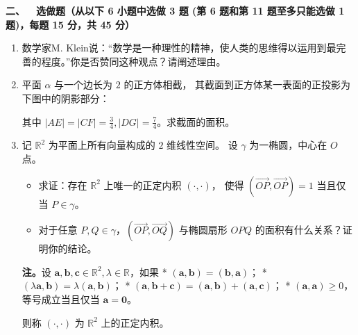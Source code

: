 \textbf{二、\ \ 选做题（从以下 6 小题中选做 3 题
(第 6 题和第 11 题至多只能选做 1 题)，每题 15 分，共 45 分）}
\begin{enumerate}
\item 数学家M. Klein说：``数学是一种理性的精神，使人类的思维得以运用到最完善的程度。''你是否赞同这种观点？请阐述理由。

\item 平面 $\alpha$ 与一个边长为 $2$ 的正方体相截，
其截面到正方体某一表面的正投影为下图中的阴影部分：
其中 $|AE|=|CF|=\frac{3}{4},|DG|=\frac{7}{4}$。求截面的面积。

\item 记 $\mathbb{R}^{2}$ 为平面上所有向量构成的 $2$ 维线性空间。
设 $\gamma$ 为一椭圆，中心在 $O$ 点。
\begin{itemize}
\item[(a)] 求证：存在 $\mathbb{R}^{2}$ 上唯一的正定内积 $(\cdot, \cdot)$，
使得 $(\overrightarrow{OP}, \overrightarrow{OP})=1$ 当且仅当 $P \in \gamma$。
\item[(b)] 对于任意 $P, Q \in \gamma$，$(\overrightarrow{OP}, \overrightarrow{OQ})$ 
与椭圆扇形 $OPQ$ 的面积有什么关系？证明你的结论。
\end{itemize}
\textbf{注。}设 $\mathbf{a}, \mathbf{b}, \mathbf{c} \in \mathbb{R}^{2}, \lambda \in \mathbb{R}$，如果
* $(\mathbf{a}, \mathbf{b})=(\mathbf{b}, \mathbf{a})$；
* $(\lambda \mathbf{a}, \mathbf{b})=\lambda(\mathbf{a}, \mathbf{b})$；
* $(\mathbf{a}, \mathbf{b}+\mathbf{c})=(\mathbf{a}, \mathbf{b})+(\mathbf{a}, \mathbf{c})$；
* $(\mathbf{a}, \mathbf{a}) \geq 0$，等号成立当且仅当 $\mathbf{a}=\mathbf{0}$。

则称 $(\cdot, \cdot)$ 为 $\mathbb{R}^{2}$ 上的正定内积。


\end{enumerate}
